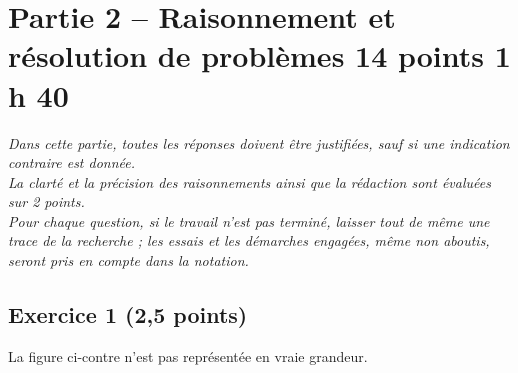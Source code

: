 \documentclass[11pt]{article}
\begin{document}
\newpage

\section*{Partie 2 – Raisonnement et résolution de problèmes 14 points 1 h 40}


\begin{mdframed}
\itshape
Dans cette partie, toutes les réponses doivent être justifiées, sauf si une indication contraire est donnée.\\
La clarté et la précision des raisonnements ainsi que la rédaction sont évaluées sur 2 points.\\
Pour chaque question, si le travail n'est pas terminé, laisser tout de même une trace de la
recherche ; les essais et les démarches engagées, même non aboutis, seront pris en compte dans la notation.
\end{mdframed}

\vspace{10pt}

\subsection*{Exercice 1 \normalfont(2,5 points)}

La figure ci-contre n'est pas représentée en vraie grandeur.
\end{document}
